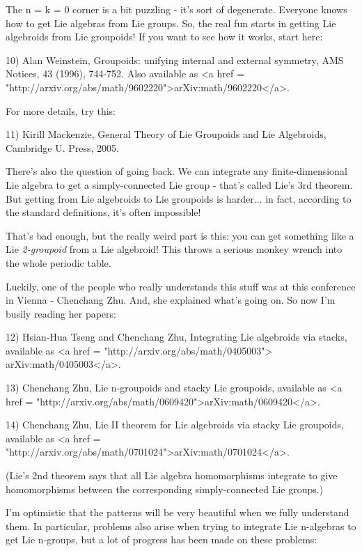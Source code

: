 The n = k = 0 corner is a bit puzzling - it's sort of degenerate.
Everyone knows how to get Lie algebras from Lie groups.  So, the
real fun starts in getting Lie algebroids from Lie groupoids!  
If you want to see how it works, start here:

10) Alan Weinstein, Groupoids: unifying internal and external 
symmetry, AMS Notices, 43 (1996), 744-752.  Also available as
<a href = "http://arxiv.org/abs/math/9602220">arXiv:math/9602220</a>.

For more details, try this:

11) Kirill Mackenzie, General Theory of Lie Groupoids and Lie 
Algebroids, Cambridge U. Press, 2005.

There's also the question of going back.  We can integrate any
finite-dimensional Lie algebra to get a simply-connected Lie group - 
that's called Lie's 3rd theorem.  But getting from Lie algebroids 
to Lie groupoids is harder... in fact, according to the standard 
definitions, it's often impossible!

That's bad enough, but the really weird part is this: you can 
get something like a Lie \emph{2-groupoid} from a Lie algebroid!  
This throws a serious monkey wrench into the whole periodic
table.

Luckily, one of the people who really understands this stuff
was at this conference in Vienna - Chenchang Zhu.  And, she 
explained what's going on.  So now I'm busily reading her papers:

12) Hsian-Hua Tseng and Chenchang Zhu, Integrating Lie algebroids 
via stacks, available as <a href = "http://arxiv.org/abs/math/0405003"> arXiv:math/0405003</a>.

13) Chenchang Zhu, Lie n-groupoids and stacky Lie groupoids, available
as <a href =
"http://arxiv.org/abs/math/0609420">arXiv:math/0609420</a>.

14) Chenchang Zhu, Lie II theorem for Lie algebroids via stacky 
Lie groupoids, available as <a href = "http://arxiv.org/abs/math/0701024">arXiv:math/0701024</a>.

(Lie's 2nd theorem says that all Lie algebra homomorphisms 
integrate to give homomorphisms between the corresponding 
simply-connected Lie groups.)

I'm optimistic that the patterns will be very beautiful when we 
fully understand them.  In particular, problems also arise
when trying to integrate Lie n-algebras to get Lie n-groups, but
a lot of progress has been made on these problems:
 
